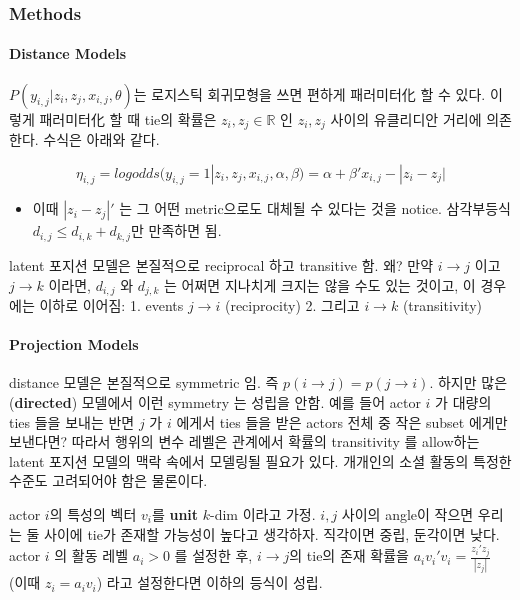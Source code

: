 \documentclass[
]{book}
\providecommand{\tightlist}{%
  \setlength{\itemsep}{0pt}\setlength{\parskip}{0pt}}
\begin{document}
{{{\hypertarget{methods}{%
\subsubsection{Methods}\label{methods}}

\hypertarget{distance-models}{%
\paragraph{Distance Models}\label{distance-models}}

\(P(y_{i,j} | z_i , z_j , x_{i,j}, \theta)\)는 로지스틱 회귀모형을 쓰면 편하게 패러미터化 할 수 있다. 이렇게 패러미터化 할 때 tie의 확률은 \(z_i , z_j \in \mathbb R\) 인 \(z_i , z_j\) 사이의 유클리디안 거리에 의존한다. 수식은 아래와 같다.

\[
\eta_{i,j} = logodds (y_{i,j} = 1 | z_i , z_j , x_{i,j}, \alpha, \beta) = \alpha + \beta ' x_{i,j} - |z_i - z_j |
\]

\begin{itemize}
\tightlist
\item
  이때 \(|z_i - z_j |'\) 는 그 어떤 metric으로도 대체될 수 있다는 것을 notice. 삼각부등식 \(d_{i,j} \le d_{i,k} + d_{k,j}\)만 만족하면 됨.
\end{itemize}

latent 포지션 모델은 본질적으로 reciprocal 하고 transitive 함. 왜? 만약 \(i \rightarrow j\) 이고 \(j \rightarrow k\) 이라면, \(d_{i,j}\) 와 \(d_{j,k}\) 는 어쩌면 지나치게 크지는 않을 수도 있는 것이고, 이 경우에는 이하로 이어짐:
1. events \(j \rightarrow i\) (reciprocity)
2. 그리고 \(i \rightarrow k\) (transitivity)

\hypertarget{projection-models}{%
\paragraph{Projection Models}\label{projection-models}}

distance 모델은 본질적으로 symmetric 임. 즉 \(p(i → j) = p(j → i)\). 하지만 많은 (\textbf{directed}) 모델에서 이런 symmetry 는 성립을 안함. 예를 들어 actor \(i\) 가 대량의 ties 들을 보내는 반면 \(j\) 가 \(i\) 에게서 ties 들을 받은 actors 전체 중 작은 subset 에게만 보낸다면? 따라서 행위의 변수 레벨은 관계에서 확률의 transitivity 를 allow하는 latent 포지션 모델의 맥락 속에서 모델링될 필요가 있다. 개개인의 소셜 활동의 특정한 수준도 고려되어야 함은 물론이다.

actor \(i\)의 특성의 벡터 \(v_i\)를 \textbf{unit} \(k\)-dim 이라고 가정. \(i,j\) 사이의 angle이 작으면 우리는 둘 사이에 tie가 존재할 가능성이 높다고 생각하자. 직각이면 중립, 둔각이면 낮다. actor \(i\) 의 활동 레벨 \(a_i >0\) 를 설정한 후, \(i→j\)의 tie의 존재 확률을 \(a_i v_i ' v_i = \frac{z_i' z_j}{| z_j |}\) (이때 \(z_i = a_i v_i\)) 라고 설정한다면 이하의 등식이 성립.

}}}
\end{document}
